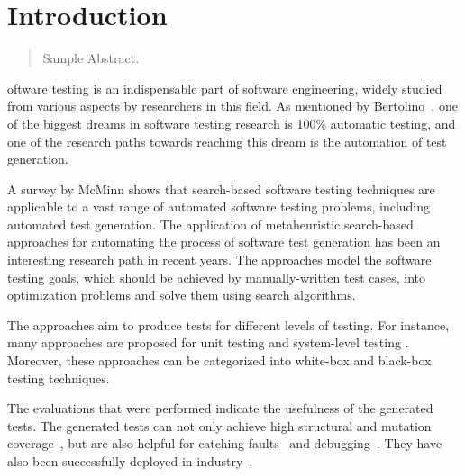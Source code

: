\chapter{Introduction}
\label{introduction}

\begin{abstract}
Sample Abstract. 
\end{abstract}



\newpage
{}oftware testing is an indispensable part of software engineering, widely studied from various aspects by researchers in this field. As mentioned by Bertolino~\cite{bertolino2007software}, one of the biggest dreams in software testing research is 100\% automatic testing, and one of the research paths towards reaching this dream is the automation of test generation.

A survey by McMinn \cite{McMinn2004} shows that search-based software testing techniques are applicable to a vast range of automated software testing problems, including automated test generation. The application of metaheuristic search-based approaches for automating the process of software test generation has been an interesting research path in recent years. The approaches model the software testing goals, which should be achieved by manually-written test cases, into optimization problems and solve them using search algorithms. 

The approaches aim to produce tests for different levels of testing. For instance, many approaches are proposed for unit testing \cite{Fraser2011, braione2017tardis, braione2018sushi, prasetya2013t3} and system-level testing \cite{Arcuri2019, Holler2012, Padhye2019, beyene2012, coppit2005, godefroid2008}. Moreover, these approaches can be categorized into white-box \cite{Fraser2011, braione2017tardis, braione2018sushi, prasetya2013t3, Arcuri2019} and black-box \cite{Holler2012, Padhye2019, beyene2012, coppit2005, godefroid2008} testing techniques. 

The evaluations that were performed indicate the usefulness of the generated tests. The generated tests can not only achieve high structural and mutation coverage~\cite{Panichella2018a, Fraser2014b}, but are also helpful for catching faults~\cite{Shamshiri2016} and debugging~\cite{Ceccato2015}. They have also been successfully deployed in industry~\cite{Alshahwan2018, almasi2017industrial}.

